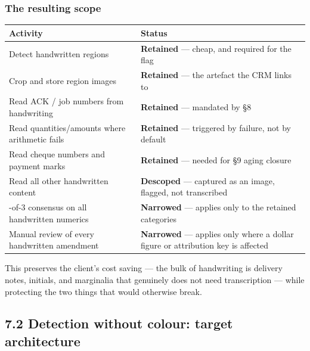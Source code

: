 \documentclass[
]{article}
\newcounter{none} %
\begin{document}
\subsubsection{The resulting scope}\label{the-resulting-scope}

{\def\LTcaptype{none} %
\begin{longtable}[]{@{}
  >{\raggedright\arraybackslash}p{}
  >{\raggedright\arraybackslash}p{}@{}}
\toprule\noalign{}
\begin{minipage}[b]{\linewidth}\raggedright
Activity
\end{minipage} & \begin{minipage}[b]{\linewidth}\raggedright
Status
\end{minipage} \\
\midrule\noalign{}
\endhead
\bottomrule\noalign{}
\endlastfoot
Detect handwritten regions & \textbf{Retained} --- cheap, and required
for the flag \\
Crop and store region images & \textbf{Retained} --- the artefact the
CRM links to \\
Read ACK / job numbers from handwriting & \textbf{Retained} --- mandated
by §8 \\
Read quantities/amounts where arithmetic fails & \textbf{Retained} ---
triggered by failure, not by default \\
Read cheque numbers and payment marks & \textbf{Retained} --- needed for
§9 aging closure \\
Read all other handwritten content & \textbf{Descoped} --- captured as
an image, flagged, not transcribed \\
3-of-3 consensus on all handwritten numerics & \textbf{Narrowed} ---
applies only to the retained categories \\
Manual review of every handwritten amendment & \textbf{Narrowed} ---
applies only where a dollar figure or attribution key is affected \\
\end{longtable}
}

This preserves the client's cost saving --- the bulk of handwriting is
delivery notes, initials, and marginalia that genuinely does not need
transcription --- while protecting the two things that would otherwise
break.

\subsection{7.2 Detection without colour: target
architecture}\label{detection-without-colour-target-architecture}
\end{document}
